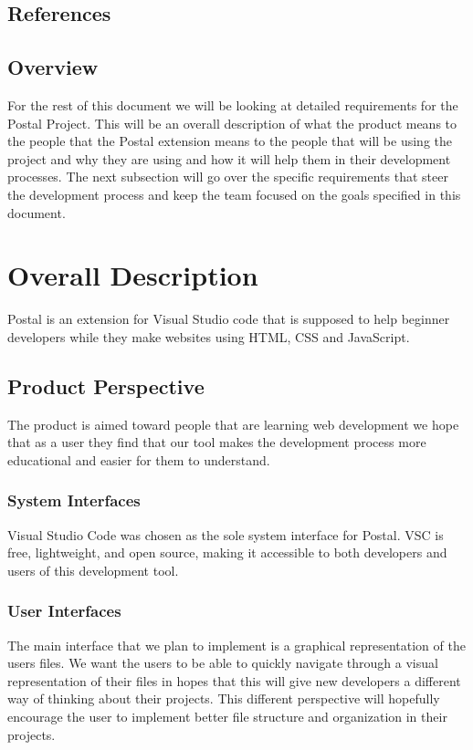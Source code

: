 \documentclass[letterpaper,10pt,titlepage,draftclsnofoot,onecolumn,onesided] {IEEEtran}
\begin{document}
\subsection{References}



\subsection{Overview}
For the rest of this document we will be looking at detailed requirements for the Postal Project. 
This will be an overall description of what the product means to the people that the Postal extension means to the people that will be using the project and why they are using and how it will help them in their development processes. 
The next subsection will go over the specific requirements that steer the development process and keep the team focused on the goals specified in this document.   

\section{Overall Description}
Postal is an extension for Visual Studio code  that is supposed to help beginner developers while they make websites using HTML, CSS and JavaScript. 

\subsection{Product Perspective}
The product is aimed toward people that are learning web development we hope that as a user they find that our tool makes the development process more educational and easier for them to understand.

\subsubsection{System Interfaces}
Visual Studio Code was chosen as the sole system interface for Postal.
VSC is free, lightweight, and open source, making it accessible to both developers and users of this development tool.

\subsubsection{User Interfaces}
The main interface that we plan to implement is a graphical representation of the users files. 
We want the users to be able to quickly navigate through a visual representation of their files in hopes that this will give new developers a different way of thinking about their projects.
This different perspective will hopefully encourage the user to implement better file structure and organization in their projects.
\end{document}
